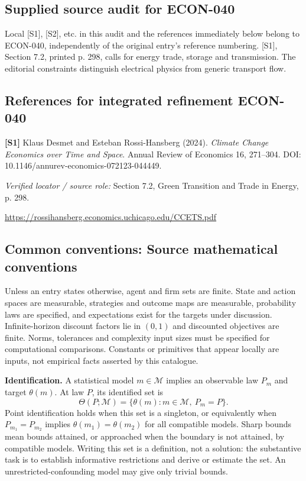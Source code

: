 \documentclass[11pt,a4paper]{article}
\begin{document}
\subsection*{Supplied source audit for ECON-040}
Local [S1], [S2], etc. in this audit and the references immediately below
belong to ECON-040, independently of the original entry's reference numbering.
[S1], Section 7.2, printed p. 298, calls for energy trade, storage and transmission. The editorial constraints distinguish electrical physics from generic transport flow.
\subsection*{References for integrated refinement ECON-040}
{\footnotesize\raggedright
\par\noindent\textbf{[S1]} Klaus Desmet and Esteban Rossi-Hansberg (2024). \emph{Climate Change Economics over Time and Space}. Annual Review of Economics 16, 271–304. DOI: 10.1146/annurev-economics-072123-044449.\par \textit{Verified locator / source role:} Section 7.2, Green Transition and Trade in Energy, p. 298.\par \url{https://rossihansberg.economics.uchicago.edu/CCETS.pdf}\par\smallskip
}

\subsection*{Common conventions: Source mathematical conventions}

Unless an entry states otherwise, agent and firm sets are finite. State and action spaces are measurable, strategies and outcome maps are measurable, probability laws are specified, and expectations exist for the targets under discussion. Infinite-horizon discount factors lie in $(0,1)$ and discounted objectives are finite. Norms, tolerances and complexity input sizes must be specified for computational comparisons. Constants or primitives that appear locally are inputs, not empirical facts asserted by this catalogue.

\textbf{Identification.} A statistical model $m\in\mathcal M$ implies an observable law $P_m$ and target $\theta(m)$. At law $P$, its identified set is
\[
\Theta(P;\mathcal M)=\{\theta(m):m\in\mathcal M,\ P_m=P\}.
\]
Point identification holds when this set is a singleton, or equivalently when $P_{m_1}=P_{m_2}$ implies $\theta(m_1)=\theta(m_2)$ for all compatible models. Sharp bounds mean bounds attained, or approached when the boundary is not attained, by compatible models. Writing this set is a definition, not a solution: the substantive task is to establish informative restrictions and derive or estimate the set. An unrestricted-confounding model may give only trivial bounds.
\end{document}
